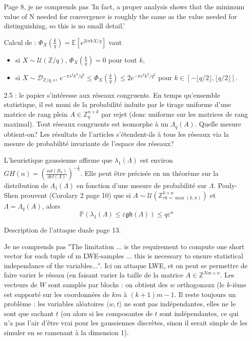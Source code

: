 \documentclass{article}
\begin{document}
Page 8, je ne comprends pas 'In fact, a proper analysis shows that the minimum value of N needed for convergence is roughly the same as the value needed for distinguishing, so this is no small detail.'

Calcul de \cite{19} : $\Phi_X(\frac{k}{q}) = \mathbb E[e^{2i\pi k X/q}] $ vaut
\begin{itemize}
\item si $X\sim \mathcal U(\mathbb Z/q)$, $\Phi_X(\frac{k}{q})  = 0$ pour tout $k$,
\item si $X\sim \mathcal D_{\mathbb Z/q , s}$, $ e^{-\pi s^2k^2 / q^2} \leq \Phi_X(\frac{k}{q})  \leq 2e^{-\pi s^2k^2 / q^2}$ pour $k\in [-\lfloor q/2\rfloor , \lfloor q/2\rfloor ]$.
\end{itemize}

2.5 : le papier s'intéresse aux réseaux congruents. En temps qu'ensemble statistique, il est muni de la probabilité induite par le tirage uniforme d'une matrice de rang plein $A\in \mathbb Z_q^{n\times k}$ par rejet (donc uniforme sur les matrices de rang maximal). Tout réseaux congruents est isomorphe à un $\Lambda_q(A)$. Quelle mesure obtient-on? Les résultats de l'articles s'étendent-ils à tous les réseaux via la mesure de probabilité invariante de l'espace des réseaux?  

L'heuristique gaussienne affirme que $\lambda_1(\Lambda)$ est environ $GH(n) = \left( \frac{vol(B_n)}{det(\Lambda)}\right)^{-\frac{1}{n}}$. Elle peut être précisée en un théorème sur la distribution de $\Lambda_1(\Lambda)$ en fonction d'une mesure de probabilité sur $\Lambda$. Pouly-Shen prouvent (Corolary 2 page 10) que si $A\sim \mathcal U(\mathbb Z^{k \times n}_{rk = \max (k,n)})$ et $\Lambda = \Lambda_q(A)$, alors
$$ \mathbb P\left( \lambda_1( \Lambda ) \leq \varepsilon \mathfrak{gh}(\Lambda) \right) \leq q\varepsilon^n  $$

Description de l'attaque duale page 13.

Je ne comprends pas "The limitation ... is the requirement to compute one short vector for each tuple of m LWE-samples ... this is necessary to ensure statistical independance of the variables...". Ici on attaque LWE, et on peut se permettre de faire varier le réseau (en faisant varier la taille de la matrice $A\in \mathbb Z^{Nm \times n}$. Les vecteurs de $W$ sont samplés par blocks : on obtient des $w$ orthogonaux (le $k$-ième est supporté sur les coordonnées de $km$  à $(k+1) m -1$. Il reste toujours un problème : les variables aléatoires $\langle w , t \rangle $ ne sont pas indépendantes, elles ne le sont que sachant $t$ (ou alors si les composantes de $t$ sont indépendantes, ce qui n'a pas l'air d'être vrai pour les gaussiennes discrètes, sinon il serait simple de les simuler en se ramenant à la dimension 1).  
\end{document}

